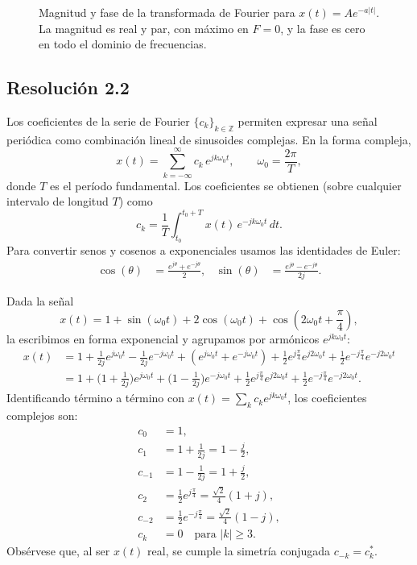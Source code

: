 \documentclass[
  11pt,
  letterpaper,
   addpoints,
   answers
  ]{exam}
\begin{document}
\begin{questions}
\begin{solution}
\begin{figure}[H]
  \caption{Magnitud y fase de la transformada de Fourier para $x(t)=A e^{-a|t|}$. La magnitud es real y par, con máximo en $F=0$, y la fase es cero en todo el dominio de frecuencias.}
  \label{fig:mag_fase_XF2}
\end{figure}

\subsection*{Resolución 2.2}
Los coeficientes de la serie de Fourier \( \{c_k\}_{k\in\mathbb{Z}} \) permiten expresar una señal periódica como combinación lineal de sinusoides complejas. En la forma compleja,
\begin{equation}
x(t)=\sum_{k=-\infty}^{\infty} c_k\,e^{jk\omega_0 t}, 
\qquad \omega_0=\frac{2\pi}{T},
\end{equation}
donde \(T\) es el período fundamental. Los coeficientes se obtienen (sobre cualquier intervalo de longitud \(T\)) como
\begin{equation}
c_k=\frac{1}{T}\int_{t_0}^{t_0+T} x(t)\,e^{-jk\omega_0 t}\,dt .
\end{equation}
Para convertir senos y cosenos a exponenciales usamos las identidades de Euler:
\begin{align}
\cos(\theta) &= \frac{e^{j\theta}+e^{-j\theta}}{2}, &
\sin(\theta) &= \frac{e^{j\theta}-e^{-j\theta}}{2j}.
\end{align}

Dada la señal
\begin{equation}
x(t)=1+\sin(\omega_0 t)+2\cos(\omega_0 t)+\cos\!\left(2\omega_0 t+\frac{\pi}{4}\right),
\end{equation}
la escribimos en forma exponencial y agrupamos por armónicos \(e^{jk\omega_0 t}\):
\begin{align}
x(t)
&= 1
+ \frac{1}{2j}e^{j\omega_0 t}-\frac{1}{2j}e^{-j\omega_0 t}
+ \left(e^{j\omega_0 t}+e^{-j\omega_0 t}\right)
+ \frac{1}{2}e^{j\frac{\pi}{4}}e^{j2\omega_0 t}
+ \frac{1}{2}e^{-j\frac{\pi}{4}}e^{-j2\omega_0 t} \\
&= 1
+ \Big(1+\tfrac{1}{2j}\Big)e^{j\omega_0 t}
+ \Big(1-\tfrac{1}{2j}\Big)e^{-j\omega_0 t}
+ \frac{1}{2}e^{j\frac{\pi}{4}}e^{j2\omega_0 t}
+ \frac{1}{2}e^{-j\frac{\pi}{4}}e^{-j2\omega_0 t}.
\end{align}
Identificando término a término con \(x(t)=\sum_k c_k e^{jk\omega_0 t}\), los coeficientes complejos son:
\begin{align}
c_0 &= 1, \\
c_{1} &= 1+\frac{1}{2j}=1-\frac{j}{2}, \\
c_{-1} &= 1-\frac{1}{2j}=1+\frac{j}{2}, \\
c_{2} &= \frac{1}{2}e^{j\frac{\pi}{4}}=\frac{\sqrt{2}}{4}(1+j), \\
c_{-2} &= \frac{1}{2}e^{-j\frac{\pi}{4}}=\frac{\sqrt{2}}{4}(1-j), \\
c_k &= 0 \quad \text{para } |k|\ge 3.
\end{align}
Obsérvese que, al ser \(x(t)\) real, se cumple la simetría conjugada \(c_{-k}=c_k^{*}\).



\end{solution}
\end{questions}
\end{document}
